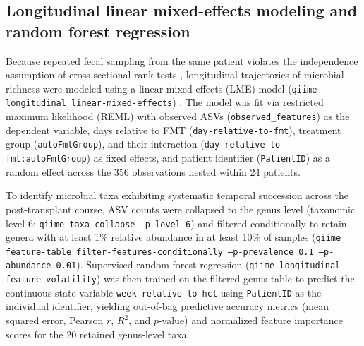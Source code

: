 \subsection{Longitudinal linear mixed-effects modeling and random forest regression}
Because repeated fecal sampling from the same patient violates the independence assumption of cross-sectional rank tests \citep{herman2024assessingb,zhou2021linda,zhang2026bayesian}, longitudinal trajectories of microbial richness were modeled using a linear mixed-effects (LME) model (\texttt{qiime longitudinal linear-mixed-effects}) \citep{barrera2025stochastic,fontaine2026locally}. The model was fit via restricted maximum likelihood (REML) with observed ASVs (\texttt{observed\_features}) as the dependent variable, days relative to FMT (\texttt{day-relative-to-fmt}), treatment group (\texttt{autoFmtGroup}), and their interaction (\texttt{day-relative-to-fmt:autoFmtGroup}) as fixed effects, and patient identifier (\texttt{PatientID}) as a random effect across the 356 observations nested within 24 patients.

To identify microbial taxa exhibiting systematic temporal succession across the post-transplant course, ASV counts were collapsed to the genus level (taxonomic level 6; \texttt{qiime taxa collapse --p-level 6}) and filtered conditionally to retain genera with at least 1\% relative abundance in at least 10\% of samples (\texttt{qiime feature-table filter-features-conditionally --p-prevalence 0.1 --p-abundance 0.01}). Supervised random forest regression (\texttt{qiime longitudinal feature-volatility}) was then trained on the filtered genus table to predict the continuous state variable \texttt{week-relative-to-hct} using \texttt{PatientID} as the individual identifier, yielding out-of-bag predictive accuracy metrics (mean squared error, Pearson $r$, $R^2$, and $p$-value) and normalized feature importance scores for the 20 retained genus-level taxa.
